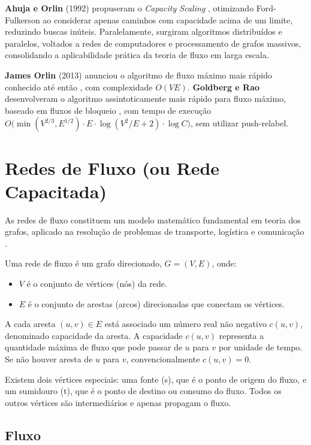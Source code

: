 \documentclass[12pt]{article}
\begin{document}
\textbf{Ahuja e Orlin} (1992) propuseram o \textit{Capacity Scaling} \cite{ahuja1993}, otimizando Ford-Fulkerson ao considerar apenas caminhos com capacidade acima de um limite, reduzindo buscas inúteis. Paralelamente, surgiram algoritmos distribuídos e paralelos, voltados a redes de computadores e processamento de grafos massivos, consolidando a aplicabilidade prática da teoria de fluxo em larga escala.

\textbf{James Orlin} (2013) anunciou o algoritmo de fluxo máximo mais rápido conhecido até então \cite{orlin2013}, com complexidade $O(VE)$. \textbf{Goldberg e Rao} desenvolveram o algoritmo assintoticamente mais rápido para fluxo máximo, baseado em fluxos de bloqueio \cite{goldberg1998}, com tempo de execução $O\big(\min(V^{2/3}, E^{1/2}) \cdot E \cdot \log(V^2/E + 2) \cdot \log C \big)$, sem utilizar push-relabel.

\newpage
\section{Redes de Fluxo  (ou Rede Capacitada)} 

As redes de fluxo constituem um modelo matemático fundamental em teoria dos grafos, aplicado na resolução de problemas de transporte, logística e comunicação \cite{ahuja1993,cormen2009}.

Uma rede de fluxo é um grafo direcionado, $G = (V, E)$, onde:

\begin{itemize}
    \item $V$ é o conjunto de vértices (nós) da rede.
    \item $E$ é o conjunto de arestas (arcos) direcionadas que conectam os vértices.
\end{itemize}

\noindent A cada aresta $(u, v) \in E$ está associado um número real não negativo $c(u, v)$, denominado capacidade da aresta. A capacidade $c(u, v)$ representa a quantidade máxima de fluxo que pode passar de $u$ para $v$ por unidade de tempo. Se não houver aresta de $u$ para $v$, convencionalmente $c(u, v) = 0$.

\noindent Existem dois vértices especiais: uma fonte (s), que é o ponto de origem do fluxo, e um sumidouro (t), que é o ponto de destino ou consumo do fluxo. Todos os outros vértices são intermediários e apenas propagam o fluxo.

\subsection{Fluxo} 
\end{document}
